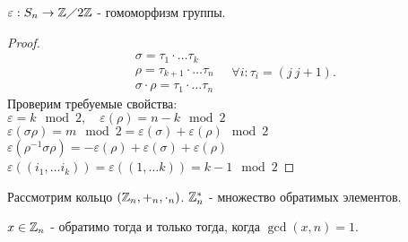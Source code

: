 \documentclass[12pt]{report}
\begin{document}
\begin{thm}
    $\varepsilon  :S_n \to \mathbb{Z} \diagup  2\mathbb{Z}$ - гомоморфизм группы.
\end{thm}
\begin{proof}
    \[
	\begin{array}{l}
	\sigma  = \tau_1 \cdot \ldots\tau_k \\
	\rho = \tau_{k+1} \cdot \ldots \tau_n\\
    \sigma \cdot \rho = \tau_1 \cdot \ldots \tau_n
    \end{array} \quad \forall i: \tau_i = (j~j+1)
    .\] 
    Проверим требуемые свойства: \\
    $\varepsilon = k \mod 2, \quad \varepsilon (\rho) = n-k\mod 2$\\
    $\varepsilon (\sigma \rho) = m \mod 2 = \varepsilon (\sigma ) + \varepsilon (\rho) \mod 2$ \\
    $\varepsilon (\rho^{-1} \sigma \rho) = - \varepsilon (\rho) + \varepsilon (\sigma ) + \varepsilon (\rho)  $\\
    $\varepsilon ((i_1, \ldots i_k)) = \varepsilon ((1, \ldots k)) = k-1 \mod 2$
\end{proof}
Рассмотрим кольцо $(\mathbb{Z}_n, +_n, \cdot_n)$. $\mathbb{Z}_n^* $ - множество обратимых элементов.

$x \in  \mathbb{Z}_n$ - обратимо тогда и только тогда, когда $\gcd(x, n) = 1$.
\end{document}
